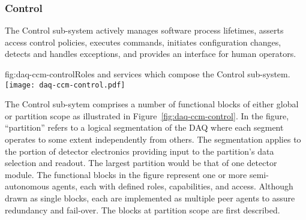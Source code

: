 \subsubsection{Control}
\label{sec:daq:design:ccm:control}


The Control sub-system actively manages  software process lifetimes, asserts access control policies, executes commands, initiates configuration changes, detects and handles exceptions, and provides an interface for human operators.



\begin{dunefigure}{fig:daq-ccm-control}{Roles and services which compose the  Control sub-system.}
  \texttt{[image: daq-ccm-control.pdf]}
\end{dunefigure}

The Control sub-sytem comprises a number of functional blocks of either global or partition scope as illustrated in Figure~\ref{fig:daq-ccm-control}. 
In the figure, ``partition'' refers to a logical segmentation of the DAQ where each segment operates to some extent independently from others. 
The segmentation applies to the portion of detector electronics providing input to the partition's data selection and readout. 
The largest partition would be that of one detector module.
The functional blocks in the figure represent one or more semi-autonomous agents, each with defined roles, capabilities, and access. 
Although drawn as single blocks, each are implemented as multiple peer agents to assure redundancy and fail-over. 
The blocks at partition scope are first described.

